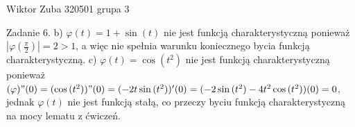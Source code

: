 \documentclass{article}
\begin{document}
Wiktor Zuba 320501 grupa 3
\newline

Zadanie 6.
\newline
\newline
b) $\varphi(t)=1+\sin{(t)}$ nie jest funkcją charakterystyczną ponieważ $|\varphi(\frac{\pi}{2})|=2>1$, a więc nie spełnia warunku koniecznego bycia funkcją charakterystyczną.\newline\newline
c) $\varphi(t)=\cos{(t^2)}$ nie jest funkcją charakterystyczną ponieważ $(\varphi)"(0)=(\cos{(t^2)})"(0)=(-2t\sin{(t^2)})'(0)=(-2\sin{(t^2)}-4t^2\cos{(t^2)})(0)=0$,
jednak $\varphi(t)$ nie jest funkcją stałą, co przeczy byciu funkcją charakterystyczną na mocy lematu z ćwiczeń.\newline
\end{document}
